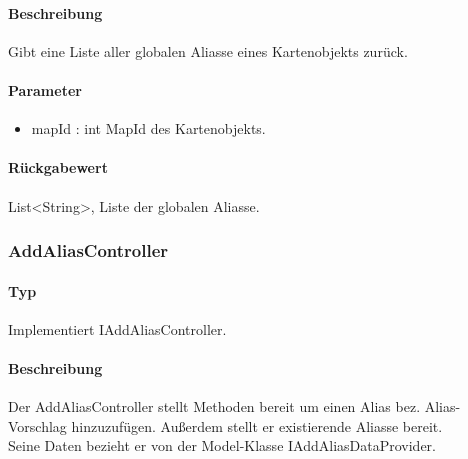 \paragraph*{Beschreibung}
Gibt eine Liste aller globalen Aliasse eines Kartenobjekts zurück.
\paragraph*{Parameter}
\begin{itemize}
    \item mapId : int MapId des Kartenobjekts.
\end{itemize}
\paragraph*{Rückgabewert}
List<String>, Liste der globalen Aliasse.

\subsubsection{AddAliasController}
\paragraph*{Typ}
Implementiert IAddAliasController.
\paragraph*{Beschreibung}
Der AddAliasController stellt Methoden bereit um einen Alias bez. Alias-Vorschlag hinzuzufügen. 
Außerdem stellt er existierende Aliasse bereit.\\
Seine Daten bezieht er von der Model-Klasse IAddAliasDataProvider.